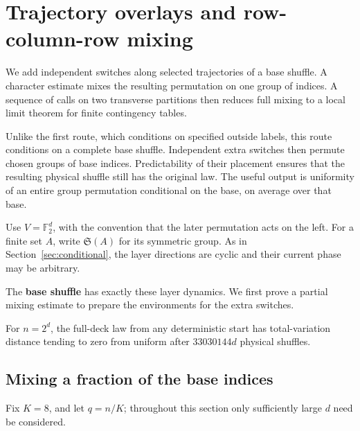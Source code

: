 \section{Trajectory overlays and row-column-row mixing}

\label{special:overlay}

We add independent switches along selected trajectories of a base shuffle. A character estimate mixes the resulting permutation on one group of indices. A sequence of calls on two transverse partitions then reduces full mixing to a local limit theorem for finite contingency tables.

Unlike the first route, which conditions on specified outside labels, this route conditions on a complete base shuffle. Independent extra switches then permute chosen groups of base indices. Predictability of their placement ensures that the resulting physical shuffle still has the original law. The useful output is uniformity of an entire group permutation conditional on the base, on average over that base.

Use $V=\mathbb F_2^d$, with the convention that the later permutation acts on the left. For a finite set $A$, write $\mathfrak S(A)$ for its symmetric group. As in Section~\ref{sec:conditional}, the layer directions are cyclic and their current phase may be arbitrary.

The \textbf{base shuffle} has exactly these layer dynamics. We first prove a partial mixing estimate to prepare the environments for the extra switches.

\begin{theorem}\label{thm:overlay}
For $n=2^d$, the full-deck law from any deterministic start has total-variation distance tending to zero from uniform after $33030144d$ physical shuffles.
\end{theorem}

\subsection{Mixing a fraction of the base indices}

Fix \(K=8\), and let \(q=n/K\); throughout this section only sufficiently large \(d\) need be considered.

